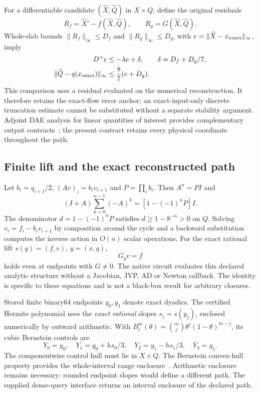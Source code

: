 For a differentiable candidate $(\widehat X,\widehat Q)$ in $X\times Q$,
define the original residuals
\begin{equation}
 R_f=\widehat X'-f(\widehat X,\widehat Q),\qquad
 R_g=G(\widehat X,\widehat Q).
\end{equation}
Whole-slab bounds $\|R_f\|_\infty\le D_f$ and
$\|R_g\|_\infty\le D_g$, with
$e=\|\widehat X-x_{\rm exact}\|_\infty$, imply
\begin{align}
 D^+e&\le-\lambda e+\delta,
 \qquad\delta=D_f+D_g/7,\label{eq:cyclic-error-ode}\\
 \|\widehat Q-q(x_{\rm exact})\|_\infty
 &\le\frac87(e+D_g).
\end{align}
This comparison uses a residual evaluated on the numerical reconstruction.
It therefore retains the exact-flow error anchor; an exact-input-only
discrete truncation estimate cannot be substituted without a separate
stability argument. Adjoint DAE analysis for linear quantities of interest
provides complementary output contracts~\cite{CLM2025}; the present contract
retains every physical coordinate throughout the path.

\subsection{Finite lift and the exact reconstructed path}

Let $b_i=q_{i+1}/2$, $(Av)_i=b_i v_{i+1}$ and $P=\prod_i b_i$.
Then $A^n=PI$ and
\begin{equation}
 (I+A)\sum_{k=0}^{n-1}(-A)^k=[1-(-1)^nP]I.
\end{equation}
The denominator $d=1-(-1)^nP$ satisfies $d\ge1-8^{-n}>0$ on $Q$.
Solving $v_i=f_i-b_i v_{i+1}$ by composition around the cycle and a backward
substitution computes the inverse action in $O(n)$ scalar operations.
For the exact rational lift $s(y)=(f,v)$, $y=(x,q)$,
\begin{equation}
 G_qv=f                                                        \label{eq:cyclic-tangency}
\end{equation}
holds even at endpoints with $G\ne0$.
The native circuit evaluates this declared analytic structure without a
Jacobian, JVP, AD or Newton callback. The identity is specific to these
equations and is not a black-box result for arbitrary closures.

Stored finite binary64 endpoints $y_0,y_1$ denote exact dyadics.
The certified Hermite polynomial uses the \emph{exact rational} slopes
$s_j=s(y_j)$, enclosed numerically by outward arithmetic. With
$B_j^m(\theta)=\binom mj\theta^j(1-\theta)^{m-j}$,
its cubic Bernstein controls are
\begin{equation}
 Y_0=y_0,\quad Y_1=y_0+hs_0/3,\quad
 Y_2=y_1-hs_1/3,\quad Y_3=y_1.                              \label{eq:cyclic-controls}
\end{equation}
The componentwise control hull must lie in $X\times Q$.
The Bernstein convex-hull property provides the whole-interval range
enclosure~\cite{MRD2018}. Arithmetic enclosure remains necessary: rounded
endpoint slopes would define a different path. The supplied dense-query
interface returns an interval enclosure of the declared path.

